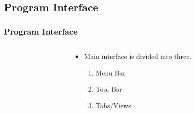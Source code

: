 \documentclass{beamer}
\begin{document}
\subsection{Program Interface}
\begin{frame}
  \frametitle{Program Interface}
  \begin{columns}
    \begin{column}{0.5\textwidth}
      \centering
    \end{column}
    
    \begin{column}{0.5\textwidth}
      \begin{itemize}
        \item Main interface is divided into three.
        \begin{enumerate}
          \item<2-> Menu Bar
          \item<3-> Tool Bar
          \item<5-> Tabs/Views
        \end{enumerate}
      \end{itemize}
    \end{column}
  \end{columns}
\end{frame}
\end{document}
